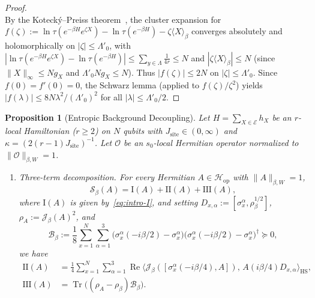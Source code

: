 \documentclass[11pt,a4paper]{article}
\numberwithin{equation}{section}
\theoremstyle{plain}
\newtheorem{proposition}[theorem]{Proposition}
\theoremstyle{definition}
\newcommand{\Hop}{\mathcal{H}_{\mathrm{op}}}
\newcommand{\HS}{\mathrm{HS}}
\newcommand{\Tr}{\operatorname{Tr}}
\begin{document}
\begin{proof}
\[\]
By the Koteck\'y--Preiss theorem~\cite{Kotecky1986,Ueltschi2004}, the cluster expansion for $f(\zeta) := \ln\tau(e^{-\beta H}e^{\zeta X}) - \ln\tau(e^{-\beta H}) - \zeta\langle X\rangle_\beta$ converges absolutely and holomorphically on $|\zeta|\le\Lambda'_0$, with $|\ln\tau(e^{-\beta H}e^{\zeta X}) - \ln\tau(e^{-\beta H})| \le \sum_{y\in\Lambda}\frac{1}{4r}\le N$ and $|\zeta\langle X\rangle_\beta|\le N$ (since $\|X\|_\infty \le N g_X$ and $\Lambda'_0 N g_X \le N$). Thus $|f(\zeta)|\le 2N$ on $|\zeta|\le\Lambda'_0$. Since $f(0) = f'(0) = 0$, the Schwarz lemma (applied to $f(\zeta)/\zeta^2$) yields $|f(\lambda)| \le 8N\lambda^2/(\Lambda'_0)^2$ for all $|\lambda|\le\Lambda'_0/2$.
\end{proof}

\begin{proposition}[Entropic Background Decoupling]\label{prop:entropic}
Let $H = \sum_{X\in\mathcal{E}} h_X$ be an $r$-local Hamiltonian ($r\ge 2$) on $N$ qubits with $J_{\mathrm{site}}\in(0,\infty)$ and $\kappa = (2(r-1)J_{\mathrm{site}})^{-1}$. Let $\mathcal{O}$ be an $s_0$-local Hermitian operator normalized to $\|\mathcal{O}\|_{\beta,W} = 1$.
\begin{enumerate}
  \setlength{\itemsep}{3pt}\setlength{\parskip}{0pt}
  \item[\emph{(1)}] \emph{Three-term decomposition.} For every Hermitian $A\in\Hop$ with $\|A\|_{\beta,W}=1$,
  \begin{equation}\label{eq:three-term}
    \mathcal{S}_\beta(A) = \mathrm{I}(A) + \mathrm{II}(A) + \mathrm{III}(A),
  \end{equation}
  where $\mathrm{I}(A)$ is given by~\eqref{eq:intro-I}, and setting $D_{x,\alpha} := [\sigma_x^\alpha,\rho_\beta^{1/2}]$, $\rho_A := \mathcal{J}_\beta(A)^2$, and
  \begin{equation}\label{eq:Bbeta-def}
    \mathcal{B}_\beta := \frac{1}{8}\sum_{x=1}^N\sum_{\alpha=1}^3 \bigl(\sigma_x^\alpha(-i\beta/2)-\sigma_x^\alpha\bigr)\bigl(\sigma_x^\alpha(-i\beta/2)-\sigma_x^\alpha\bigr)^\dagger \succeq 0,
  \end{equation}
  we have
  \begin{align}
    \mathrm{II}(A) &= \frac{1}{4}\sum_{x=1}^N\sum_{\alpha=1}^3 \operatorname{Re}\bigl\langle\mathcal{J}_\beta([\sigma_x^\alpha(-i\beta/4),A]),\, A(i\beta/4)D_{x,\alpha}\bigr\rangle_\HS, \label{eq:II-def}\\
    \mathrm{III}(A) &= \Tr\!\bigl((\rho_A - \rho_\beta)\mathcal{B}_\beta\bigr). \label{eq:III-def}
  \end{align}

\end{enumerate}
\end{proposition}
\end{document}
